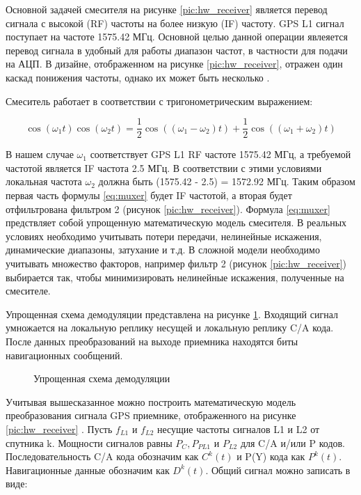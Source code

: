 Основной задачей смесителя на рисунке \ref{pic:hw_receiver} является перевод сигнала с высокой (RF) частоты на более низкую (IF)
частоту. GPS L1 сигнал поступает на частоте 1575.42 МГц. Основной целью данной операции явлеяется перевод сигнала
в удобный для работы диапазон частот, в частности для подачи на АЦП. В дизайне, отображенном на рисунке \ref{pic:hw_receiver},
отражен один каскад понижения частоты, однако их может быть несколько \cite{gps}. 

Смеситель работает в соответствии с тригонометрическим выражением:

\begin{equation}
\cos(\omega_1 t)\cos(\omega_2 t) = 
	\frac{1}{2}\cos((\omega_1 - \omega_2)t) + \frac{1}{2}\cos((\omega_1 + \omega_2)t)
\label{eq:muxer}
\end{equation}

В нашем случае ${\omega_1}$ соответствует GPS L1 RF частоте 1575.42 МГц, а требуемой частотой является IF частота 2.5 МГц. В соответствии 
с этими условиями локальная частота ${\omega_2}$ должна быть (1575.42 - 2.5) = 1572.92 МГц. Таким образом первая часть формулы
\ref{eq:muxer} будет IF частотой, а вторая будет отфильтрована фильтром 2 (рисунок \ref{pic:hw_receiver}). Формула \ref{eq:muxer} 
предствляет собой упрощенную математическую модель смесителя. В реальных условиях необходимо учитывать потери передачи, нелинейные
искажения, динамические диапазоны, затухание и т.д. В сложной модели необходимо учитывать множество факторов, например
фильтр 2 (рисунок \ref{pic:hw_receiver}) выбирается так, чтобы минимизировать нелинейные искажения, полученные на смесителе.

Упрощенная схема демодуляции представлена на рисунке \ref{pic:signal_conversion}. Входящий сигнал умножается на локальную реплику несущей
и локальную реплику C/A кода. После данных преобразований на выходе приемника находятся биты навигационных сообщений.

\begin{figure}[h]
\begin{center}
\end{center}
\caption{Упрощенная схема демодуляции}
\label{pic:signal_conversion}
\end{figure}

Учитывая вышесказанное можно построить математическую модель преобразования сигнала GPS приемнике,
отображенного на рисунке \ref{pic:hw_receiver} \cite{gps}.
Пусть ${f_{L1}}$ и ${f_{L2}}$ несущие частоты сигналов L1 и L2 от спутника k. Мощности сигналов равны  ${P_C, P_{PL1}}$ и
${P_{L2}}$ для C/A и/или P кодов. Последовательность C/A кода обозначим как ${C^k(t)}$ и P(Y) кода как ${P^k(t)}$.
Навигационные данные обозначим как ${D^k(t)}$. Общий сигнал можно записать в виде:

